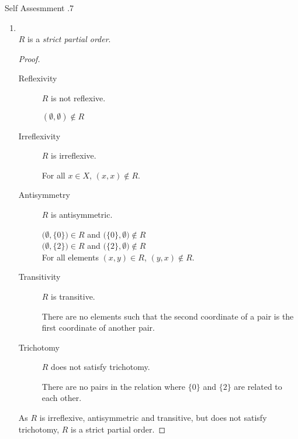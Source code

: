 \documentclass[../notes.tex]{subfiles}
\begin{document}
\begin{exercise}{Self Assesmment \thechapter.7}
\begin{enumerate}
							\begin{enumerate}[label=(\alph*)]
								\item {}\\
									$R$ is a \emph{strict partial order}.	
									\begin{proof}
										$ $
										\begin{description}
											\item[Reflexivity] $R$ is not reflexive.
												\begin{subproof}[Counterexample]
													$(\emptyset, \emptyset) \notin R$
												\end{subproof}
											\item[Irreflexivity] $R$ is irreflexive.
												\begin{subproof}
													For all $x \in X$, $(x, x) \notin R$.
												\end{subproof}
											\item[Antisymmetry] $R$ is antisymmetric.
												\begin{subproof}
													$\bigl(\emptyset, \{0\}\bigr) \in R$ and $\bigl(\{0\}, \emptyset\bigr) \notin R$\\
													$\bigl(\emptyset, \{2\}\bigr) \in R$ and $\bigl(\{2\}, \emptyset\bigr) \notin R$\\
													For all elements $(x, y) \in R$, $(y, x) \notin R$.
												\end{subproof}
											\item[Transitivity] $R$ is transitive.
												\begin{subproof}
													There are no elements such that the second coordinate of a pair is the first coordinate of another pair.
												\end{subproof}
											\item[Trichotomy] $R$ does not satisfy trichotomy.
												\begin{subproof}[Counterexample]
													There are no pairs in the relation where $\{0\}$ and $\{2\}$ are related to each other.
												\end{subproof}
										\end{description}
										As $R$ is irreflexive, antisymmetric and transitive, but does not satisfy trichotomy, $R$ is a strict partial order.
									\end{proof}

\end{enumerate}
\end{enumerate}
\end{exercise}
\end{document}

